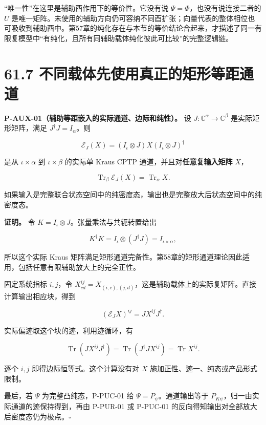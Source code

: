 \documentclass[
  11pt,
  oneside]{book}
\begin{document}
``唯一性''在这里是辅助酉作用下的等价性。它没有说
\(\Psi=\Phi\)，也没有说连接二者的 \(U\)
是唯一矩阵。未使用的辅助方向仍可容纳不同酉扩张；向量代表的整体相位也可吸收到辅助酉中。第57章的纯化存在与本节的等价结论合起来，才描述了同一有限复模型中``有纯化，且所有同辅助载体纯化彼此可比较''的完整逻辑链。

\hypertarget{ux4e0dux540cux8f7dux4f53ux5148ux4f7fux7528ux771fux6b63ux7684ux77e9ux5f62ux7b49ux8dddux901aux9053}{%
\section{61.7
不同载体先使用真正的矩形等距通道}\label{ux4e0dux540cux8f7dux4f53ux5148ux4f7fux7528ux771fux6b63ux7684ux77e9ux5f62ux7b49ux8dddux901aux9053}}

\protect\hypertarget{p-aux-01}{}{}

\textbf{P-AUX-01（辅助等距嵌入的实际通道、边际和纯性）。} 设
\(J:\mathbb C^\alpha\to\mathbb C^\beta\) 是实际矩形矩阵，满足
\(J^\dagger J=I_\alpha\)。则

\[
\mathcal E_J(X)=(I_\iota\otimes J)X(I_\iota\otimes J)^\dagger
\]

是从 \(\iota\times\alpha\) 到 \(\iota\times\beta\) 的实际单 Kraus CPTP
通道，并且对\textbf{任意复输入矩阵} \(X\)，

\[
\operatorname{Tr}_\beta\mathcal E_J(X)
=\operatorname{Tr}_\alpha X.
\]

如果输入是完整联合状态空间中的纯密度态，输出也是完整放大后状态空间中的纯密度态。

\textbf{证明。} 令 \(K=I_\iota\otimes J\)。张量乘法与共轭转置给出

\[
K^\dagger K=I_\iota\otimes(J^\dagger J)
=I_{\iota\times\alpha},
\]

所以这个实际 Kraus
矩阵满足矩形通道完备性。第58章的矩形通道理论因此适用，包括任意有限辅助放大上的完全正性。

固定系统指标 \(i,j\)，令
\(X^{ij}_{cd}=X_{(i,c),(j,d)}\)，这是辅助载体上的实际复矩阵。直接计算输出相应块，得到

\[
(\mathcal E_JX)^{ij}=JX^{ij}J^\dagger.
\]

实际偏迹取这个块的迹，利用迹循环，有

\[
\operatorname{Tr}(JX^{ij}J^\dagger)
=\operatorname{Tr}(J^\dagger JX^{ij})
=\operatorname{Tr}X^{ij}.
\]

逐个 \(i,j\) 即得边际恒等式。这个计算没有对 \(X\)
施加正性、迹一、纯态或产品形式限制。

最后，若 \(\Psi\) 为完整凸纯态，P-PUC-01 给
\(\Psi=P_\psi\)。通道输出等于
\(P_{K\psi}\)，归一由实际通道的迹保持得到，再由 P-PUR-01 或 P-PUC-01
的反向得知输出对全部放大后密度态仍为极点。\(\square\)
\end{document}
